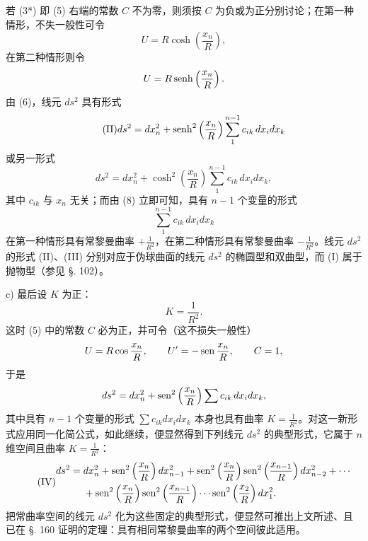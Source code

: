 若 (3*) 即 (5) 右端的常数 $C$ 不为零，则须按 $C$ 为负或为正分别讨论；在第一种情形，不失一般性可令
\[
 U=R\cosh\left(\frac{x_n}{R}\right),
\]
在第二种情形则令
\[
 U=R\operatorname{senh}\left(\frac{x_n}{R}\right).
\]
由 (6)，线元 $ds^2$ 具有形式
\[
\tag{II}
 ds^2=dx_n^2+\operatorname{senh}^2\left(\frac{x_n}{R}\right)\sum_{1}^{n-1}c_{ik}\,dx_i dx_k
\]
或另一形式
\[
\tag{III}
 ds^2=dx_n^2+\cosh^2\left(\frac{x_n}{R}\right)\sum_{1}^{n-1}c_{ik}\,dx_i dx_k,
\]
其中 $c_{ik}$ 与 $x_n$ 无关；而由 (8) 立即可知，具有 $n-1$ 个变量的形式
\[
 \sum_{1}^{n-1}c_{ik}\,dx_i dx_k
\]
在第一种情形具有常黎曼曲率 $+\frac1{R^2}$，在第二种情形具有常黎曼曲率 $-\frac1{R^2}$。线元 $ds^2$ 的形式 (II)、(III) 分别对应于伪球曲面的线元 $ds^2$ 的椭圆型和双曲型，而 (I) 属于抛物型（参见 §. 102）。

c) 最后设 $K$ 为正：
\[
 K=\frac1{R^2}.
\]
这时 (5) 中的常数 $C$ 必为正，并可令（这不损失一般性）
\[
 U=R\cos\frac{x_n}{R},
 \qquad
 U'=-\operatorname{sen}\frac{x_n}{R},
 \qquad C=1,
\]
于是
\[
 ds^2=dx_n^2+\operatorname{sen}^2\left(\frac{x_n}{R}\right)\sum c_{ik}\,dx_i dx_k,
\]
其中具有 $n-1$ 个变量的形式 $\sum c_{ik}dx_i dx_k$ 本身也具有曲率 $K=\frac1{R^2}$。对这一新形式应用同一化简公式，如此继续，便显然得到下列线元 $ds^2$ 的典型形式，它属于 $n$ 维空间且曲率 $K=\frac1{R^2}$：
\[
\tag{IV}
\begin{aligned}
 ds^2={}&dx_n^2+
 \operatorname{sen}^2\left(\frac{x_n}{R}\right)dx_{n-1}^2+
 \operatorname{sen}^2\left(\frac{x_n}{R}\right)\operatorname{sen}^2\left(\frac{x_{n-1}}{R}\right)dx_{n-2}^2+\cdots\\
&+\operatorname{sen}^2\left(\frac{x_n}{R}\right)\operatorname{sen}^2\left(\frac{x_{n-1}}{R}\right)\cdots
 \operatorname{sen}^2\left(\frac{x_2}{R}\right)dx_1^2.
\end{aligned}
\]
把常曲率空间的线元 $ds^2$ 化为这些固定的典型形式，便显然可推出上文所述、且已在 §. 160 证明的定理：具有相同常黎曼曲率的两个空间彼此适用。
